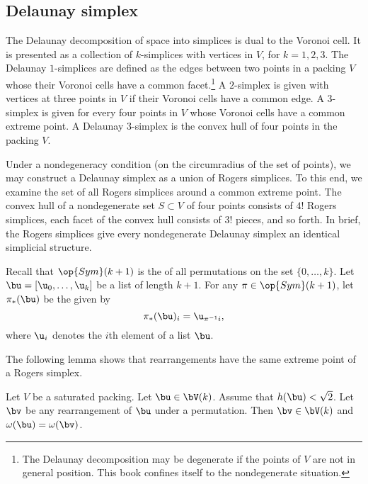\subsection{Delaunay simplex}

The Delaunay decomposition of space into simplices is dual to the
Voronoi cell.  It is presented as a collection of $k$-simplices with
vertices in $V$, for $k=1,2,3$.  The Delaunay $1$-simplices are
defined as the edges between two points in a packing $V$ whose their
Voronoi cells have a common facet.\footnote{The Delaunay decomposition
  may be degenerate if the points of $V$ are not in general position.
  This book confines itself to the nondegenerate situation.}  A
$2$-simplex is given with vertices at three points in $V$ if their
Voronoi cells have a common edge.  A $3$-simplex is given for every
four points in $V$ whose Voronoi cells have a common extreme point.  A
Delaunay $3$-simplex is the convex hull of four points in the packing
$V$.

Under a nondegeneracy condition (on the circumradius of the set of
points), we may construct a Delaunay simplex as a union of Rogers
simplices.  To this end, we examine the set of all Rogers simplices
around a common extreme point.  The convex hull of a nondegenerate set
$S\subset V$ of four points consists of $4!$ Rogers simplices,  each
facet of the convex hull consists of $3!$ pieces,  and so
forth.  In brief, the Rogers simplices give every nondegenerate
Delaunay simplex an identical simplicial structure.


Recall that $\op{Sym}(k+1)$ is the  of all permutations
on the set $\{0,\ldots,k\}$.  Let $\bu = [\u_0,\ldots, \u_k]$ be a
list of length $k+1$.  For any 
$\pi\in\op{Sym}(k+1)$, let $\pi_*(\bu)$ be the 
given by
\[  
\pi_*(\bu)_i =  \u_{\pi^{-1} i}, %
\]    
where $\u_i$ denotes the $i$th element of a list $\bu$.
%
%

The following lemma shows that rearrangements have the same extreme
point of a Rogers simplex.

\begin{lemma}   
\label{lemma:perm-Vk} 
  Let $V$ be a saturated packing.  Let $\bu\in \bV(k)$.  Assume that
  $h(\bu)<\sqrt2$. Let $\bv$ be any rearrangement of $\bu$ under a
  permutation.  Then $\bv\in \bV(k)$ and $\omega(\bu) = \omega(\bv)$.
\end{lemma}

